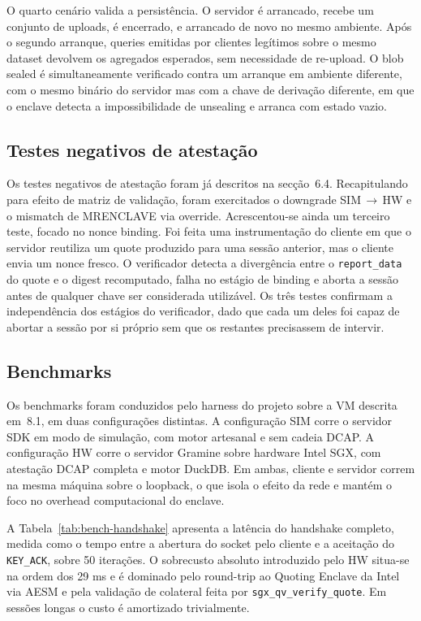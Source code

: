 O quarto cenário valida a persistência. O servidor é arrancado, recebe um conjunto de uploads, é encerrado, e arrancado de novo no mesmo ambiente. Após o segundo arranque, queries emitidas por clientes legítimos sobre o mesmo dataset devolvem os agregados esperados, sem necessidade de re-upload. O blob sealed é simultaneamente verificado contra um arranque em ambiente diferente, com o mesmo binário do servidor mas com a chave de derivação diferente, em que o enclave detecta a impossibilidade de unsealing e arranca com estado vazio.

\subsection{Testes negativos de atestação}

Os testes negativos de atestação foram já descritos na secção~6.4. Recapitulando para efeito de matriz de validação, foram exercitados o downgrade SIM\,$\to$\,HW e o mismatch de MRENCLAVE via override. Acrescentou-se ainda um terceiro teste, focado no nonce binding. Foi feita uma instrumentação do cliente em que o servidor reutiliza um quote produzido para uma sessão anterior, mas o cliente envia um nonce fresco. O verificador detecta a divergência entre o \texttt{report\_data} do quote e o digest recomputado, falha no estágio de binding e aborta a sessão antes de qualquer chave ser considerada utilizável. Os três testes confirmam a independência dos estágios do verificador, dado que cada um deles foi capaz de abortar a sessão por si próprio sem que os restantes precisassem de intervir.

\subsection{Benchmarks}

Os benchmarks foram conduzidos pelo harness do projeto sobre a VM descrita em~8.1, em duas configurações distintas. A configuração SIM corre o servidor SDK em modo de simulação, com motor artesanal e sem cadeia DCAP. A configuração HW corre o servidor Gramine sobre hardware Intel SGX, com atestação DCAP completa e motor DuckDB. Em ambas, cliente e servidor correm na mesma máquina sobre o loopback, o que isola o efeito da rede e mantém o foco no overhead computacional do enclave.

A Tabela~\ref{tab:bench-handshake} apresenta a latência do handshake completo, medida como o tempo entre a abertura do socket pelo cliente e a aceitação do \texttt{KEY\_ACK}, sobre 50 iterações. O sobrecusto absoluto introduzido pelo HW situa-se na ordem dos 29 ms e é dominado pelo round-trip ao Quoting Enclave da Intel via AESM e pela validação de colateral feita por \texttt{sgx\_qv\_verify\_quote}. Em sessões longas o custo é amortizado trivialmente.

